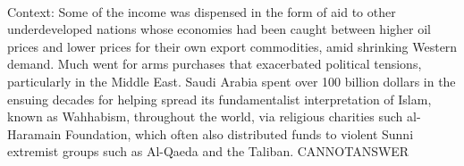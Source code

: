 \documentclass[11pt,a4paper, onecolumn]{article}
\begin{document}
\\ Context: Some of the income was dispensed in the form of aid to other underdeveloped nations whose economies had been caught between higher oil prices and lower prices for their own export commodities, amid shrinking Western demand. Much went for arms purchases that exacerbated political tensions, particularly in the Middle East. Saudi Arabia spent over 100 billion dollars in the ensuing decades for helping spread its fundamentalist interpretation of Islam, known as Wahhabism, throughout the world, via religious charities such al-Haramain Foundation, which often also distributed funds to violent Sunni extremist groups such as Al-Qaeda and the Taliban. CANNOTANSWER
\end{document}
